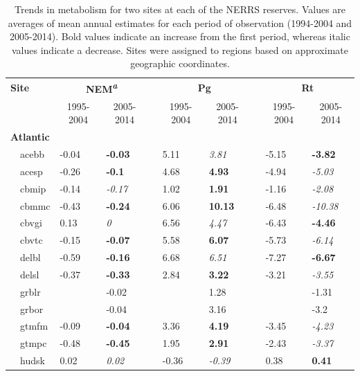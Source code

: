 \documentclass[10pt,letterpaper]{article}\usepackage[]{graphicx}\usepackage[]{color}
\begin{document}
\begin{table}[!tbp]
{\footnotesize
\caption{Trends in metabolism for two sites at each of the \gls{NERRS} reserves.  Values are averages of mean annual estimates for each period of observation (1994-2004 and 2005-2014). Bold values indicate an increase from the first period, whereas italic values indicate a decrease. Sites were assigned to regions based on approximate geographic coordinates.\label{tab:metab_tab}} 
\begin{center}
\begin{tabular}{lllcllcll}
\hline\hline
\multicolumn{1}{l}{\bfseries Site}&\multicolumn{2}{c}{\bfseries NEM\textsuperscript{{\it a}}}&\multicolumn{1}{c}{\bfseries }&\multicolumn{2}{c}{\bfseries Pg}&\multicolumn{1}{c}{\bfseries }&\multicolumn{2}{c}{\bfseries Rt}\tabularnewline
\cline{2-3} \cline{5-6} \cline{8-9}
\multicolumn{1}{l}{}&\multicolumn{1}{c}{1995-2004}&\multicolumn{1}{c}{2005-2014}&\multicolumn{1}{c}{}&\multicolumn{1}{c}{1995-2004}&\multicolumn{1}{c}{2005-2014}&\multicolumn{1}{c}{}&\multicolumn{1}{c}{1995-2004}&\multicolumn{1}{c}{2005-2014}\tabularnewline
\hline
{\bfseries Atlantic}&&&&&&&&\tabularnewline
~~acebb&-0.04&{\bf -0.03}&&5.11&{\it 3.81}&&-5.15&{\bf -3.82}\tabularnewline
~~acesp&-0.26&{\bf -0.1}&&4.68&{\bf 4.93}&&-4.94&{\it -5.03}\tabularnewline
~~cbmip&-0.14&{\it -0.17}&&1.02&{\bf 1.91}&&-1.16&{\it -2.08}\tabularnewline
~~cbmmc&-0.43&{\bf -0.24}&&6.06&{\bf 10.13}&&-6.48&{\it -10.38}\tabularnewline
~~cbvgi&0.13&{\it 0}&&6.56&{\it 4.47}&&-6.43&{\bf -4.46}\tabularnewline
~~cbvtc&-0.15&{\bf -0.07}&&5.58&{\bf 6.07}&&-5.73&{\it -6.14}\tabularnewline
~~delbl&-0.59&{\bf -0.16}&&6.68&{\it 6.51}&&-7.27&{\bf -6.67}\tabularnewline
~~delsl&-0.37&{\bf -0.33}&&2.84&{\bf 3.22}&&-3.21&{\it -3.55}\tabularnewline
~~grblr&&-0.02&&&1.28&&&-1.31\tabularnewline
~~grbor&&-0.04&&&3.16&&&-3.2\tabularnewline
~~gtmfm&-0.09&{\bf -0.04}&&3.36&{\bf 4.19}&&-3.45&{\it -4.23}\tabularnewline
~~gtmpc&-0.48&{\bf -0.45}&&1.95&{\bf 2.91}&&-2.43&{\it -3.37}\tabularnewline
~~hudsk&0.02&{\it 0.02}&&-0.36&{\it -0.39}&&0.38&{\bf 0.41}\tabularnewline

\end{tabular}
\end{center}}
\end{table}
\end{document}
